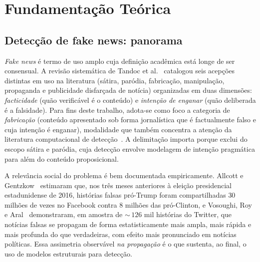 
\chapter{Fundamenta\c{c}\~ao Te\'orica}
\label{cap:fundamentacao}

\section{Detec\c{c}\~ao de fake news: panorama}
\label{sec:panorama}

\emph{Fake news} \'e termo de uso amplo cuja defini\c{c}\~ao
acad\^emica est\'a longe de ser consensual. A revis\~ao sistem\'atica
de Tandoc et al.~\cite{tandoc2018defining} catalogou seis acep\c{c}\~oes
distintas em uso na literatura (s\'atira, par\'odia, fabrica\c{c}\~ao,
manipula\c{c}\~ao, propaganda e publicidade disfar\c{c}ada de not\'icia)
organizadas em duas dimens\~oes: \emph{facticidade} (qu\~ao
verific\'avel \'e o conte\'udo) e \emph{inten\c{c}\~ao de enganar} (qu\~ao
deliberada \'e a falsidade). Para fins deste trabalho, adota-se como
foco a categoria de \emph{fabrica\c{c}\~ao} (conte\'udo apresentado
sob forma jornal\'istica que \'e factualmente falso e cuja inten\c{c}\~ao
\'e enganar), modalidade que tamb\'em concentra a aten\c{c}\~ao da
literatura computacional de detec\c{c}\~ao~\cite{pmc_overviewfakenews,
ieee_fakenewslandscape}. A delimita\c{c}\~ao importa porque exclui do
escopo s\'atira e par\'odia, cuja detec\c{c}\~ao envolve modelagem de
inten\c{c}\~ao pragm\'atica para al\'em do conte\'udo proposicional.

A relev\^ancia social do problema \'e bem documentada empiricamente.
Allcott e Gentzkow~\cite{allcott2017socialmedia} estimaram que, nos
tr\^es meses anteriores \`a elei\c{c}\~ao presidencial estadunidense
de 2016, hist\'orias falsas pr\'o-Trump foram compartilhadas $30$
milh\~oes de vezes no Facebook contra $8$ milh\~oes das pr\'o-Clinton,
e Vosoughi, Roy e Aral~\cite{vosoughi2018spread} demonstraram, em
amostra de $\sim$\,$126$ mil hist\'orias do Twitter, que not\'icias
falsas se propagam de forma estatisticamente mais ampla, mais r\'apida
e mais profunda do que verdadeiras, com efeito mais pronunciado em
not\'icias pol\'iticas. Essa assimetria observ\'avel \emph{na
propaga\c{c}\~ao} \'e o que sustenta, ao final, o uso de modelos
estruturais para detec\c{c}\~ao.

